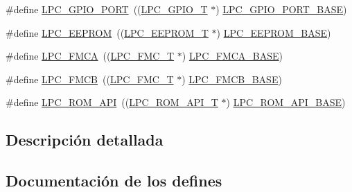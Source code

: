 \begin{DoxyCompactItemize}
\item 
\#define \hyperlink{group___p_e_r_i_p_h__18_x_x___b_a_s_e_ga401a76842ea88d6e311bba578f43b259}{L\+P\+C\+\_\+\+G\+P\+I\+O\+\_\+\+P\+O\+RT}~((\hyperlink{struct_l_p_c___g_p_i_o___t}{L\+P\+C\+\_\+\+G\+P\+I\+O\+\_\+T}             $\ast$) \hyperlink{group___p_e_r_i_p_h__43_x_x___b_a_s_e_ga7de0e57c07a6bd4ff8cf9f2b85249ed4}{L\+P\+C\+\_\+\+G\+P\+I\+O\+\_\+\+P\+O\+R\+T\+\_\+\+B\+A\+SE})
\item 
\#define \hyperlink{group___p_e_r_i_p_h__18_x_x___b_a_s_e_ga3af7cc9a426f661ac4deee8a9997a830}{L\+P\+C\+\_\+\+E\+E\+P\+R\+OM}~((\hyperlink{struct_l_p_c___e_e_p_r_o_m___t}{L\+P\+C\+\_\+\+E\+E\+P\+R\+O\+M\+\_\+T}           $\ast$) \hyperlink{group___p_e_r_i_p_h__43_x_x___b_a_s_e_ga9d1fcaafb9feb0f8253c3cef1edc7e9f}{L\+P\+C\+\_\+\+E\+E\+P\+R\+O\+M\+\_\+\+B\+A\+SE})
\item 
\#define \hyperlink{group___p_e_r_i_p_h__18_x_x___b_a_s_e_ga3337d6fd79512d56b2c2362cb48b0ff5}{L\+P\+C\+\_\+\+F\+M\+CA}~((\hyperlink{struct_l_p_c___f_m_c___t}{L\+P\+C\+\_\+\+F\+M\+C\+\_\+T}              $\ast$) \hyperlink{group___p_e_r_i_p_h__43_x_x___b_a_s_e_gaf59ae457b89f9991f1528a5625234445}{L\+P\+C\+\_\+\+F\+M\+C\+A\+\_\+\+B\+A\+SE})
\item 
\#define \hyperlink{group___p_e_r_i_p_h__18_x_x___b_a_s_e_ga13ff7e03af04887218e740c984f0af3e}{L\+P\+C\+\_\+\+F\+M\+CB}~((\hyperlink{struct_l_p_c___f_m_c___t}{L\+P\+C\+\_\+\+F\+M\+C\+\_\+T}              $\ast$) \hyperlink{group___p_e_r_i_p_h__43_x_x___b_a_s_e_ga9c9492ce5a1b5e99d6500db256f020c6}{L\+P\+C\+\_\+\+F\+M\+C\+B\+\_\+\+B\+A\+SE})
\item 
\#define \hyperlink{group___p_e_r_i_p_h__18_x_x___b_a_s_e_ga93f07fc38c09c20a7141e175ce599ef7}{L\+P\+C\+\_\+\+R\+O\+M\+\_\+\+A\+PI}~((\hyperlink{struct_l_p_c___r_o_m___a_p_i___t}{L\+P\+C\+\_\+\+R\+O\+M\+\_\+\+A\+P\+I\+\_\+T}          $\ast$) \hyperlink{group___p_e_r_i_p_h__43_x_x___b_a_s_e_ga2ae00d891b7603694f3a1eb640013f63}{L\+P\+C\+\_\+\+R\+O\+M\+\_\+\+A\+P\+I\+\_\+\+B\+A\+SE})
\end{DoxyCompactItemize}


\subsection{Descripción detallada}


\subsection{Documentación de los \textquotesingle{}defines\textquotesingle{}}
